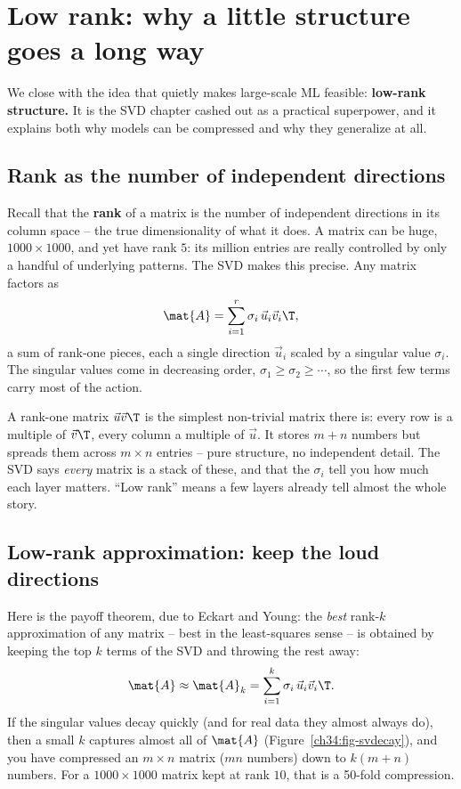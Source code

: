 \section{Low rank: why a little structure goes a long way}
\label{ch34:lowrank}

We close with the idea that quietly makes large-scale ML feasible: \textbf{low-rank
structure.} It is the SVD chapter cashed out as a practical superpower, and it explains
both why models can be compressed and why they generalize at all.

\subsection{Rank as the number of independent directions}

Recall that the \textbf{rank} of a matrix is the number of independent directions in its
column space -- the true dimensionality of what it does. A matrix can be huge,
$1000\times1000$, and yet have rank $5$: its million entries are really controlled by only
a handful of underlying patterns. The SVD makes this precise. Any matrix factors as
\[
\mat{A} = \sum_{i=1}^{r} \sigma_i\,\vec{u}_i\vec{v}_i\T,
\]
a sum of rank-one pieces, each a single direction $\vec{u}_i$ scaled by a singular value
$\sigma_i$. The singular values come in decreasing order, $\sigma_1\ge\sigma_2\ge\cdots$,
so the first few terms carry most of the action.

\begin{intuitionbox}
A rank-one matrix $\vec{u}\vec{v}\T$ is the simplest non-trivial matrix there is: every
row is a multiple of $\vec{v}\T$, every column a multiple of $\vec{u}$. It stores
$m+n$ numbers but spreads them across $m\times n$ entries -- pure structure, no
independent detail. The SVD says \emph{every} matrix is a stack of these, and that the
$\sigma_i$ tell you how much each layer matters. ``Low rank'' means a few layers already
tell almost the whole story.
\end{intuitionbox}

\subsection{Low-rank approximation: keep the loud directions}

Here is the payoff theorem, due to Eckart and Young: the \emph{best} rank-$k$
approximation of any matrix -- best in the least-squares sense -- is obtained by keeping
the top $k$ terms of the SVD and throwing the rest away:
\[
\mat{A} \approx \mat{A}_k = \sum_{i=1}^{k} \sigma_i\,\vec{u}_i\vec{v}_i\T.
\]
If the singular values decay quickly (and for real data they almost always do), then a
small $k$ captures almost all of $\mat{A}$ (Figure~\ref{ch34:fig-svdecay}), and you have
compressed an $m\times n$ matrix
($mn$ numbers) down to $k(m+n)$ numbers. For a $1000\times1000$ matrix kept at rank $10$,
that is a 50-fold compression.


